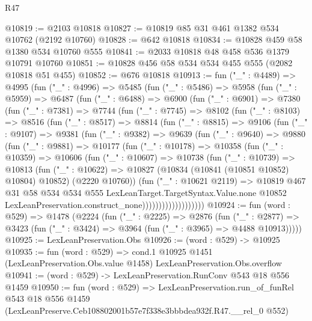 \begin{lexlean}{R47}
\begin{coremodule}
@10819 := @2103 @10818
@10827 := @10819 @85 @31 @461 @1382 @534 @10762 (@2192 @10760)
@10828 := @642 @10818
@10834 := @10828 @459 @58 @1380 @534 @10760 @555
@10841 := @2033 @10818 @48 @458 @536 @1379 @10791 @10760
@10851 := @10828 @456 @58 @534 @534 @455 @555 (@2082 @10818 @51 @455)
@10852 := @676 @10818
@10913 := fun ("_" : @4489) =>
  @4995
    (fun ("_" : @4996) =>
    @5485
      (fun ("_" : @5486) =>
      @5958
        (fun ("_" : @5959) =>
        @6487
          (fun ("_" : @6488) =>
          @6900
            (fun ("_" : @6901) =>
            @7380
              (fun ("_" : @7381) =>
              @7744
                (fun ("_" : @7745) =>
                @8102
                  (fun ("_" : @8103) =>
                  @8516
                    (fun ("_" : @8517) =>
                    @8814
                      (fun ("_" : @8815) =>
                      @9106
                        (fun ("_" : @9107) =>
                        @9381
                          (fun ("_" : @9382) =>
                          @9639
                            (fun ("_" : @9640) =>
                            @9880
                              (fun ("_" : @9881) =>
                              @10177
                                (fun ("_" : @10178) =>
                                @10358
                                  (fun ("_" : @10359) =>
                                  @10606
                                    (fun ("_" : @10607) =>
                                    @10738
                                      (fun ("_" : @10739) =>
                                      @10813
                                        (fun ("_" : @10622) =>
                                        @10827
                                          (@10834 (@10841 (@10851 @10852) @10804) @10852)
                                          (@2220 @10760))
                                        (fun ("_" : @10621 @2119) =>
                                        @10819
                                          @467
                                          @31
                                          @58
                                          @534
                                          @534
                                          @555
                                          LexLeanTarget.TargetSyntax.Value.none
                                          @10852
                                          LexLeanPreservation.construct_none)))))))))))))))))))
@10924 := fun (word : @529) =>
  @1478
    (@2224
      (fun ("_" : @2225) =>
      @2876
        (fun ("_" : @2877) =>
        @3423 (fun ("_" : @3424) => @3964 (fun ("_" : @3965) => @4488 @10913)))))
@10925 := LexLeanPreservation.Obs
@10926 := (word : @529) -> @10925
@10935 := fun (word : @529) =>
  cond.{1} @10925 @1451 (LexLeanPreservation.Obs.value @1458) LexLeanPreservation.Obs.overflow
@10941 := (word : @529) -> LexLeanPreservation.RunConv @543 @18 @556 @1459
@10950 := fun (word : @529) =>
  LexLeanPreservation.run_of_funRel
    @543
    @18
    @556
    @1459
    (LexLeanPreserve.Ceb108802001b57e7f338e3bbbdea932f.R47.__rel_0 @552)
\end{coremodule}
\end{lexlean}
